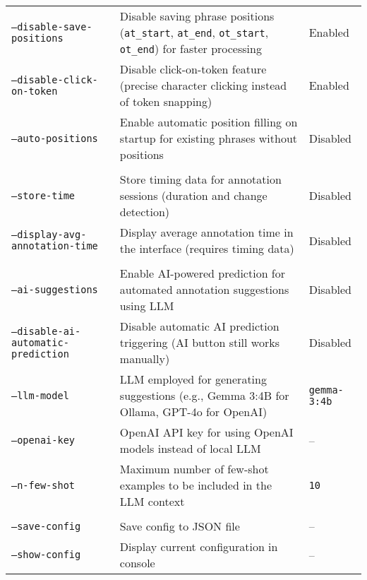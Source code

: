 \begin{tabular}{@{}l p{9cm} p{8cm}@{}}
\rowcolor{gray!5}
\texttt{--disable-save-positions} & Disable saving phrase positions (\texttt{at\_start}, \texttt{at\_end}, \texttt{ot\_start}, \texttt{ot\_end}) for faster processing & Enabled \\
\texttt{--disable-click-on-token} & Disable click-on-token feature (precise character clicking instead of token snapping) & Enabled \\
\rowcolor{gray!5}
\texttt{--auto-positions} & Enable automatic position filling on startup for existing phrases without positions & Disabled \\
\addlinespace[0.3em]
\hline
\multicolumn{3}{@{}l}{\textit{Analytics and Timing}} \\
\addlinespace[0.2em]
\texttt{--store-time} & Store timing data for annotation sessions (duration and change detection) & Disabled \\
\rowcolor{gray!5}
\texttt{--display-avg-annotation-time} & Display average annotation time in the interface (requires timing data) & Disabled \\
\addlinespace[0.3em]
\hline
\multicolumn{3}{@{}l}{\textit{AI Integration}} \\
\addlinespace[0.2em]
\rowcolor{gray!5}
\texttt{--ai-suggestions} & Enable AI-powered prediction for automated annotation suggestions using LLM & Disabled \\
\texttt{--disable-ai-automatic-prediction} & Disable automatic AI prediction triggering (AI button still works manually) & Disabled \\
\rowcolor{gray!5}
\texttt{--llm-model} & LLM employed for generating suggestions (e.g., Gemma 3:4B for Ollama, GPT-4o for OpenAI) & \texttt{gemma-3:4b} \\
\texttt{--openai-key} & OpenAI API key for using OpenAI models instead of local LLM & -- \\
\rowcolor{gray!5}
\texttt{--n-few-shot} & Maximum number of few-shot examples to be included in the LLM context & \texttt{10} \\
\addlinespace[0.3em]
\hline
\multicolumn{3}{@{}l}{\textit{Configuration Management}} \\
\addlinespace[0.2em]
\texttt{--save-config} & Save config to JSON file & -- \\
\rowcolor{gray!5}
\texttt{--show-config} & Display current configuration in console & -- \\
\bottomrule
\end{tabular}